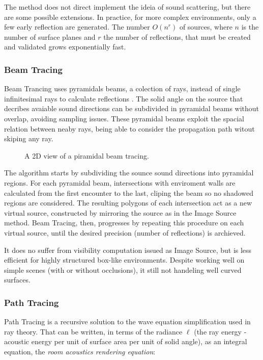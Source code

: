 The method does not direct implement the ideia of sound scattering, but there
are some possible extensions\cite{chandak2011fast}. In practice, for more
complex environments, only a few early reflection are generated. The number
$O(n^r)$ of sources, where $n$ is the number of surface planes and $r$ the
number of reflections, that must be created and validated grows exponentially
fast.

\subsubsection{Beam Tracing}

Beam Trancing uses pyramidals beams, a colection of rays, instead of single
infinitesimal rays to calculate reflections \cite{funkhouser2003survey}. The
solid angle on the source that decribes avaiable sound directions can be
subdivided in pyramidal beams without overlap, avoiding sampling issues. These
pyramidal beams exploit the spacial relation between neaby rays, being able to
consider the propagation path witout skiping any ray.

\begin{figure}[h]
	\centering
	
	\caption{A 2D view of a piramidal beam tracing.}
	\label{fig:beamtrace}
\end{figure}

The algorithm starts by subdividing the sounce sound directions into pyramidal
regions. For each pyramidal beam, intersections with enviroment walls are
calculated from the first encounter to the last, cliping the beam so no
shadowed regions are considered. The resulting polygons of each intersection act
as a new virtual source, constructed by mirroring the source as in the Image
Source method. Beam Tracing, then, progresses by repeating this procedure on
each virtual source, until the desired precision (number of reflections) is
archieved.

It does no suffer from visibility computation issued as Image Source, but is
less efficient for highly structured box-like environments. Despite working well
on simple scenes (with or without occlusions), it still not handeling well
curved surfaces.


\subsubsection{Path Tracing}

Path Tracing is a recursive solution to the wave equation simplification used in
ray theory. That can be written, in terms of the radiance $\ell$ (the ray
energy - acoustic energy per unit of surface area per unit of solid angle), as an
integral equation, the \textit{room acoustics rendering
equation}\cite{siltanen2007room}:

